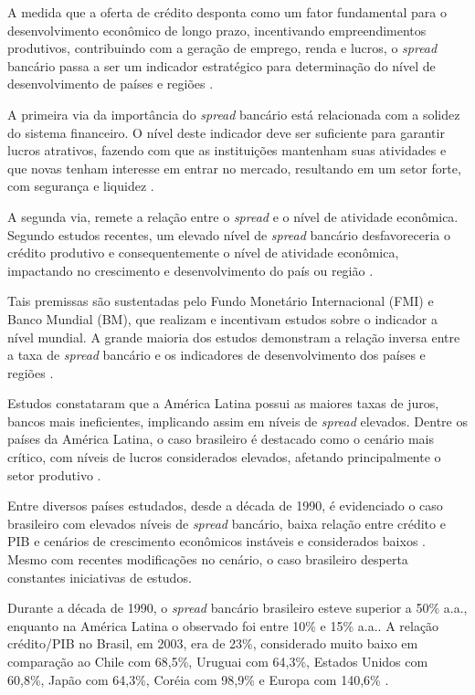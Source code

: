 \documentclass[
  12pt,
  12pt,
  openright,
  oneside,
  a4paper,
  chapter=TITLE,
  section=TITLE,
  subsection=TITLE,
  subsubsection=TITLE,
  portugues,
  sumario=tradicional]{abntex2}
\begin{document}
A medida que a oferta de crédito desponta como um fator fundamental para o desenvolvimento econômico de longo prazo, incentivando empreendimentos produtivos, contribuindo com a geração de emprego, renda e lucros, o \emph{spread} bancário passa a ser um indicador estratégico para determinação do nível de desenvolvimento de países e regiões \cite{WB:2005, levine:1997}.

A primeira via da importância do \emph{spread} bancário está relacionada com a solidez do sistema financeiro. O nível deste indicador deve ser suficiente para garantir lucros atrativos, fazendo com que as instituições mantenham suas atividades e que novas tenham interesse em entrar no mercado, resultando em um setor forte, com segurança e liquidez \cite{levine:1997, dantas:2012, leal:2006}.

A segunda via, remete a relação entre o \emph{spread} e o nível de atividade econômica. Segundo estudos recentes, um elevado nível de \emph{spread} bancário desfavoreceria o crédito produtivo e consequentemente o nível de atividade econômica, impactando no crescimento e desenvolvimento do país ou região \cite{WB:2005, dantas:2012, leal:2006}.

Tais premissas são sustentadas pelo Fundo Monetário Internacional (FMI) e Banco Mundial (BM), que realizam e incentivam estudos sobre o indicador a nível mundial. A grande maioria dos estudos demonstram a relação inversa entre a taxa de \emph{spread} bancário e os indicadores de desenvolvimento dos países e regiões \cite{WB:2005}.

Estudos constataram que a América Latina possui as maiores taxas de juros, bancos mais ineficientes, implicando assim em níveis de \emph{spread} elevados. Dentre os países da América Latina, o caso brasileiro é destacado como o cenário mais crítico, com níveis de lucros considerados elevados, afetando principalmente o setor produtivo \cite{dantas:2012}.

Entre diversos países estudados, desde a década de 1990, é evidenciado o caso brasileiro com elevados níveis de \emph{spread} bancário, baixa relação entre crédito e PIB e cenários de crescimento econômicos instáveis e considerados baixos \cite{levine:1997, matos:2003}. Mesmo com recentes modificações no cenário, o caso brasileiro desperta constantes iniciativas de estudos.

Durante a década de 1990, o \emph{spread} bancário brasileiro esteve superior a 50\% a.a., enquanto na América Latina o observado foi entre 10\% e 15\% a.a.. A relação crédito/PIB no Brasil, em 2003, era de 23\%, considerado muito baixo em comparação ao Chile com 68,5\%, Uruguai com 64,3\%, Estados Unidos com 60,8\%, Japão com 64,3\%, Coréia com 98,9\% e Europa com 140,6\% \cite{camargo:2009, singh:2005}.
\end{document}

